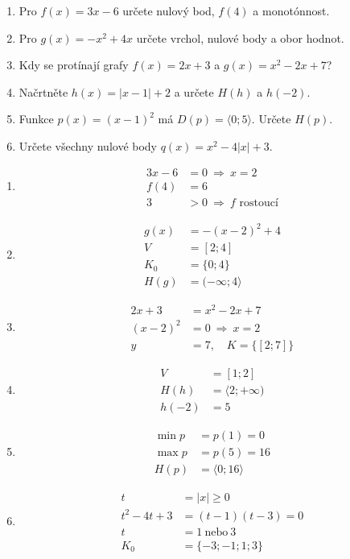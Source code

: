 \documentclass[11pt,a4paper]{article}
\begin{document}
\begin{zadaniReseniBox}[title={Domácí úkol}]
\begin{enumerate}[label=\alph*),itemsep=2pt]
\item Pro $f(x)=3x-6$ určete nulový bod, $f(4)$ a monotónnost.
\item Pro $g(x)=-x^2+4x$ určete vrchol, nulové body a obor hodnot.
\item Kdy se protínají grafy $f(x)=2x+3$ a $g(x)=x^2-2x+7$?
\item Načrtněte $h(x)=|x-1|+2$ a určete $H(h)$ a $h(-2)$.
\item Funkce $p(x)=(x-1)^2$ má $D(p)=\langle0;5\rangle$. Určete $H(p)$.
\item Určete všechny nulové body $q(x)=x^2-4|x|+3$.
\end{enumerate}
\tcblower
\begin{enumerate}[label=\alph*),itemsep=2pt]
\item
\[
\begin{aligned}
3x-6&=0\ \Rightarrow\ x=2\\
f(4)&=6\\
3&>0\ \Rightarrow\ f\text{ rostoucí}
\end{aligned}
\]
\item
\[
\begin{aligned}
g(x)&=-(x-2)^2+4\\
V&=[2;4]\\
K_0&=\{0;4\}\\
H(g)&=(-\infty;4\rangle
\end{aligned}
\]
\item
\[
\begin{aligned}
2x+3&=x^2-2x+7\\
(x-2)^2&=0\ \Rightarrow\ x=2\\
y&=7,\quad K=\{[2;7]\}
\end{aligned}
\]
\item
\[
\begin{aligned}
V&=[1;2]\\
H(h)&=\langle2;+\infty)\\
h(-2)&=5
\end{aligned}
\]
\item
\[
\begin{aligned}
\min p&=p(1)=0\\
\max p&=p(5)=16\\
H(p)&=\langle0;16\rangle
\end{aligned}
\]
\item
\[
\begin{aligned}
t&=|x|\ge0\\
t^2-4t+3&=(t-1)(t-3)=0\\
t&=1\ \text{nebo}\ 3\\
K_0&=\{-3;-1;1;3\}
\end{aligned}
\]
\end{enumerate}
\end{zadaniReseniBox}
\end{document}
